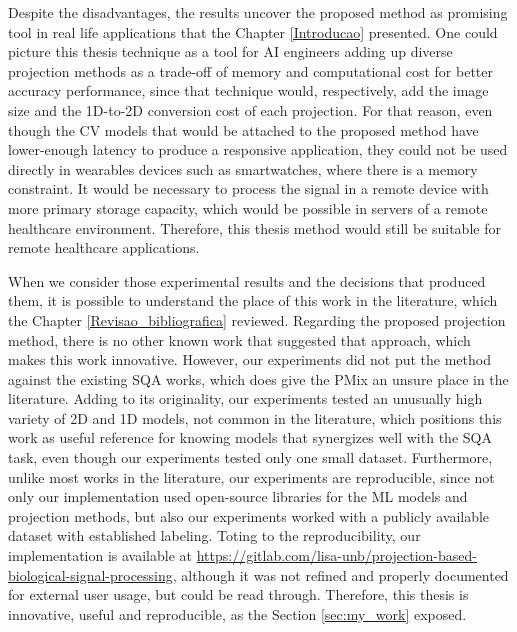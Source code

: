 Despite the disadvantages, the results uncover the proposed method as promising tool in real life applications that the Chapter \ref{Introducao} presented.
One could picture this thesis technique as a tool for \gls{AI} engineers adding up diverse projection methods as a trade-off of memory and computational cost for better accuracy performance, since that technique would, respectively, add the image size and the 1D-to-2D conversion cost of each projection. 
For that reason, even though the \gls{CV} models that would be attached to the proposed method have lower-enough latency to produce a responsive application, they could not be used directly in wearables devices such as smartwatches, where there is a memory constraint.
It would be necessary to process the signal in a remote device with more primary storage capacity, which would be possible in servers of a remote healthcare environment. 
Therefore, this thesis method would still be suitable for remote healthcare applications.	 


When we consider those experimental results and the decisions that produced them, it is possible to understand the place of this work in the literature, which the Chapter \ref{Revisao_bibliografica} reviewed. 
Regarding the proposed projection method, there is no other known work that suggested that approach, which makes this work innovative. However, our experiments did not put the method against the existing \gls{SQA} works, which does give the \gls{PMix} an unsure place in the literature. 
Adding to its originality, our experiments tested an unusually high variety of 2D and 1D models, not common in the literature, which positions this work as useful reference for knowing models that synergizes well with the \gls{SQA} task, even though our experiments tested only one small dataset. 
Furthermore, unlike most works in the literature, our experiments are reproducible, since not only our implementation used open-source libraries for the \gls{ML} models and projection methods, but also our experiments worked with a publicly available dataset with established labeling. Toting to the reproducibility, our implementation is available at \url{https://gitlab.com/lisa-unb/projection-based-biological-signal-processing}, although it was not refined and properly documented for external user usage, but could be read through.
Therefore, this thesis is innovative, useful and reproducible, as the Section \ref{sec:my_work} exposed.      

